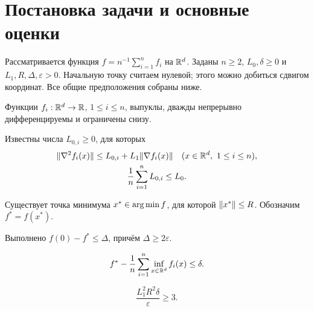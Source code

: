 \section{Постановка задачи и основные оценки}\label{sec:setting}

Рассматривается функция $f=n^{-1}\sum_{i=1}^n f_i$ на $\mathbb R^d$.
Заданы $n\ge2$, $L_0,\delta\ge0$ и $L_1,R,\Delta,\varepsilon>0$.
Начальную точку считаем нулевой; этого можно добиться сдвигом координат.
Все общие предположения собраны ниже.

\begin{assumption}[компоненты]\label{asm:components}
Функции $f_i:\mathbb R^d\to\mathbb R$, $1\le i\le n$, выпуклы,
дважды непрерывно дифференцируемы и ограничены снизу.
\end{assumption}

\begin{assumption}\label{asm:smoothness}
Известны числа $L_{0,i}\ge0$, для которых
\begin{equation}\label{eq:component-class}
 \begin{gathered}
 \lVert\nabla^2 f_i(x)\rVert\le L_{0,i}+L_1\lVert\nabla f_i(x)\rVert
 \quad(x\in\mathbb R^d,\ 1\le i\le n),\\
 \frac1n\sum_{i=1}^n L_{0,i}\le L_0.
 \end{gathered}
\end{equation}
\end{assumption}

\begin{assumption}\label{asm:minimizer}
Существует точка минимума $x^\ast\in\operatorname{arg\,min} f$, для которой $\lVert x^\ast\rVert\le R$.
Обозначим $f^\ast=f(x^\ast)$.
\end{assumption}

\begin{assumption}\label{asm:initial-gap}
Выполнено $f(0)-f^\ast\le\Delta$, причём $\Delta\ge2\varepsilon$.
\end{assumption}

\begin{assumption}[неоднородность]\label{asm:heterogeneity}
\begin{equation}\label{eq:problem-bounds}
 f^\ast-\frac1n\sum_{i=1}^n\inf_{x\in\mathbb R^d}f_i(x)\le\delta.
\end{equation}
\end{assumption}

\begin{assumption}\label{asm:accuracy}
\begin{equation}\label{eq:nondegenerate}
 \frac{L_1^2R^2\delta}{\varepsilon}\ge3.
\end{equation}
\end{assumption}

